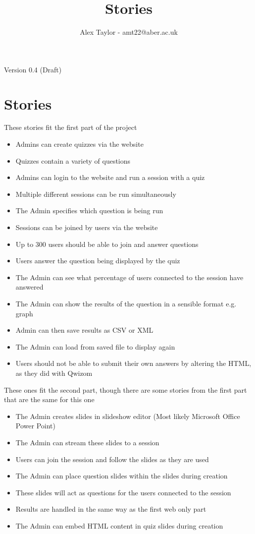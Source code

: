 \documentclass{article}
\title{Stories}
\author{Alex Taylor - amt22@aber.ac.uk}
\begin{document}
\maketitle
\begin{center}
	Version 0.4 (Draft)
\end{center}
\thispagestyle{empty}

\section{Stories}
These stories fit the first part of the project
\begin{itemize}
	\item Admins can create quizzes via the website
	\item Quizzes contain a variety of questions
	\item Admins can login to the website and run a session with a quiz
	\item Multiple different sessions can be run simultaneously
	\item The Admin specifies which question is being run
	\item Sessions can be joined by users via the website
	\item Up to 300 users should be able to join and answer questions
	\item Users answer the question being displayed by the quiz
	\item The Admin can see what percentage of users connected to the session have answered
	\item The Admin can show the results of the question in a sensible format e.g. graph
	\item Admin can then save results as CSV or XML
	\item The Admin can load from saved file to display again
	\item Users should not be able to submit their own answers by altering the HTML, as they did with Qwizom
\end{itemize}
These ones fit the second part, though there are some stories from the first part that are the same for this one
\begin{itemize}
	\item The Admin creates slides in slideshow editor (Most likely Microsoft Office Power Point)
	\item The Admin can stream these slides to a session
	\item Users can join the session and follow the slides as they are used	
	\item The Admin can place question slides within the slides during creation
	\item These slides will act as questions for the users connected to the session
	\item Results are handled in the same way as the first web only part
	\item The Admin can embed HTML content in quiz slides during creation
\end{itemize}
\end{document}
